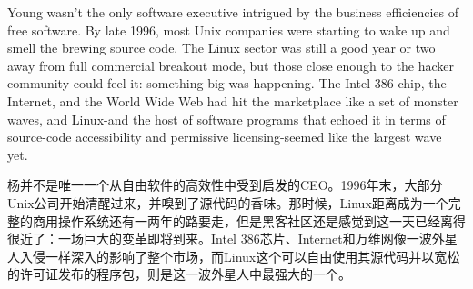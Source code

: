 \ifdefined\eng
Young wasn't the only software executive intrigued by the business efficiencies of free software. By late 1996, most Unix companies were starting to wake up and smell the brewing source code. The Linux sector was still a good year or two away from full commercial breakout mode, but those close enough to the hacker community could feel it: something big was happening. The Intel 386 chip, the Internet, and the World Wide Web had hit the marketplace like a set of monster waves, and Linux-and the host of software programs that echoed it in terms of source-code accessibility and permissive licensing-seemed like the largest wave yet.
\fi

\ifdefined\chs
杨并不是唯一一个从自由软件的高效性中受到启发的CEO。1996年末，大部分Unix公司开始清醒过来，并嗅到了源代码的香味。那时候，Linux距离成为一个完整的商用操作系统还有一两年的路要走，但是黑客社区还是感觉到这一天已经离得很近了：一场巨大的变革即将到来。Intel 386芯片、Internet和万维网像一波外星人入侵一样深入的影响了整个市场，而Linux这个可以自由使用其源代码并以宽松的许可证发布的程序包，则是这一波外星人中最强大的一个。
\fi

